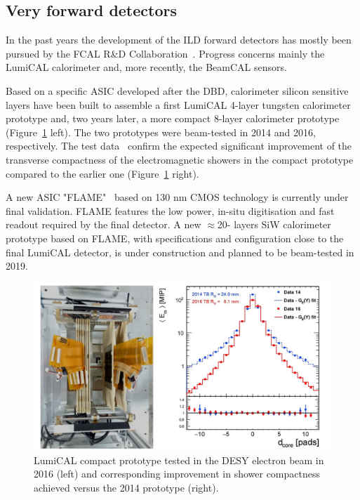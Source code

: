 \subsection{Very forward detectors}

In the past years the development of the ILD forward detectors has mostly been pursued by the FCAL R\&D Collaboration~\cite{ild:bib:FCAL}. Progress concerns mainly the LumiCAL calorimeter and, more recently, the BeamCAL sensors.

Based on a specific ASIC developed after the DBD, calorimeter silicon sensitive layers have been built to assemble a first LumiCAL 4-layer tungsten calorimeter prototype and, two years later, a more compact 8-layer calorimeter prototype (Figure~\ref{fig:det:LUMICAL_perf} left). The two prototypes were beam-tested in 2014 and 2016, respectively. The test data~\cite{Abramowicz:2018vwb} confirm the expected significant improvement of the transverse compactness of the electromagnetic showers in the compact prototype compared to the earlier one (Figure~\ref{fig:det:LUMICAL_perf} right). 

A new ASIC "FLAME"~\cite{ild:bib:FLAME} based on 130 nm CMOS technology is currently under final validation. FLAME features the low power, in-situ digitisation and fast readout required by the final detector. A new $\approx$20- layers SiW calorimeter prototype based on FLAME, with specifications and configuration close to the final LumiCAL detector, is under construction and planned to be beam-tested in 2019. 

\begin{figure}[t!]
\centering
\includegraphics[width=1.0\hsize]{Detector/fig/LUMICAL_perf.jpg}
\caption{LumiCAL compact prototype tested in the DESY electron beam in 2016 (left) and corresponding improvement in shower compactness achieved versus the 2014 prototype (right).}
\label{fig:det:LUMICAL_perf}
\end{figure}

